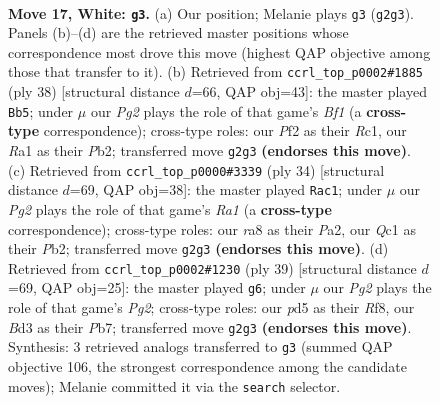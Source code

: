 \documentclass[11pt]{article}
\begin{document}
\clearpage

\begin{figure}[p]\centering
\begin{subfigure}{0.46\textwidth}\centering
\resizebox{\linewidth}{!}{%
\newchessgame
\chessboard[
  setfen={r3r1k1/pp4pp/2nbpq2/3p4/8/N2B4/PPP2PPP/R1Q1R1K1 w - - 2 17},
  showmover=false,
  pgfstyle=straightmove, color=movearrow, markmove={g2-g3}
]}
\caption{}
\end{subfigure}\hfill
\begin{subfigure}{0.46\textwidth}\centering
\resizebox{\linewidth}{!}{%
\newchessgame
\chessboard[
  setfen={r3qrk1/pbp2pp1/1p3b1p/8/3N2R1/P3P1P1/1PQ2PP1/2R1KB2 w - - 3 20},
  showmover=false,
  pgfstyle=straightmove, color=movearrow, markmove={f1-b5}
]}
\caption{}
\end{subfigure}
\\[4pt]
\begin{subfigure}{0.46\textwidth}\centering
\resizebox{\linewidth}{!}{%
\newchessgame
\chessboard[
  setfen={r1b1r1k1/pp2qpp1/2p4p/3n4/3N4/1Q2P2P/PP2BPP1/R2R2K1 w - - 0 18},
  showmover=false,
  pgfstyle=straightmove, color=movearrow, markmove={a1-c1}
]}
\caption{}
\end{subfigure}\hfill
\begin{subfigure}{0.46\textwidth}\centering
\resizebox{\linewidth}{!}{%
\newchessgame
\chessboard[
  setfen={r4r2/pp3qpk/2n1b2p/2p5/7N/2PQ4/PP3PPP/R1B2RK1 b - - 5 20},
  showmover=false,
  pgfstyle=straightmove, color=movearrow, markmove={g7-g6}
]}
\caption{}
\end{subfigure}
\caption{\textbf{Move 17, White: \texttt{g3}.} (a) Our position; Melanie plays \texttt{g3} (\texttt{g2g3}). Panels (b)--(d) are the retrieved master positions whose correspondence most drove this move (highest QAP objective among those that transfer to it). (b) Retrieved from \texttt{ccrl\_top\_p0002\#1885} (ply 38) [structural distance $d$=66, QAP obj=43]: the master played \texttt{Bb5}; under $\mu$ our \emph{Pg2} plays the role of that game's \emph{Bf1} (a \textbf{cross-type} correspondence); cross-type roles: our \emph{P}f2 as their \emph{R}c1, our \emph{R}a1 as their \emph{P}b2; transferred move \texttt{g2g3} \textbf{(endorses this move)}. (c) Retrieved from \texttt{ccrl\_top\_p0000\#3339} (ply 34) [structural distance $d$=69, QAP obj=38]: the master played \texttt{Rac1}; under $\mu$ our \emph{Pg2} plays the role of that game's \emph{Ra1} (a \textbf{cross-type} correspondence); cross-type roles: our \emph{r}a8 as their \emph{P}a2, our \emph{Q}c1 as their \emph{P}b2; transferred move \texttt{g2g3} \textbf{(endorses this move)}. (d) Retrieved from \texttt{ccrl\_top\_p0002\#1230} (ply 39) [structural distance $d$=69, QAP obj=25]: the master played \texttt{g6}; under $\mu$ our \emph{Pg2} plays the role of that game's \emph{Pg2}; cross-type roles: our \emph{p}d5 as their \emph{R}f8, our \emph{B}d3 as their \emph{P}b7; transferred move \texttt{g2g3} \textbf{(endorses this move)}. Synthesis: 3 retrieved analogs transferred to \texttt{g3} (summed QAP objective 106, the strongest correspondence among the candidate moves); Melanie committed it via the \texttt{search} selector.}
\label{fig:thought-m32}
\end{figure}
\end{document}
